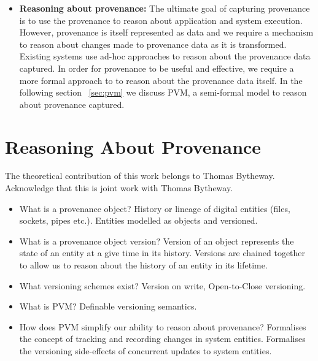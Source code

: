 \documentclass[withindex,glossary]{cam-thesis}
\begin{document}
\begin{itemize}
\item \textbf{Reasoning about provenance:}
The ultimate goal of capturing provenance is to use the provenance to reason about application and system execution. However, provenance is itself represented as data and we require a mechanism to reason about changes made to provenance data as it is transformed. Existing systems use ad-hoc approaches to reason about the provenance data captured. In order for provenance to be useful and effective, we require a more formal approach to to reason about the provenance data itself. In the following section ~\ref{sec:pvm} we discuss PVM, a semi-formal model to reason about provenance captured.

\end{itemize}

\section{Reasoning About Provenance}
The theoretical contribution of this work belongs to Thomas Bytheway.
Acknowledge that this is joint work with Thomas Bytheway.
\begin{itemize}
\item What is a provenance object? History or lineage of digital entities (files, sockets, pipes etc.). Entities modelled as objects and versioned.
\item What is a provenance object version? Version of an object represents the state of an entity at a give time in its history. Versions are chained together to allow us to reason about the history of an entity in its lifetime.
\item What versioning schemes exist? Version on write, Open-to-Close versioning.
\item What is PVM? Definable versioning semantics.
\item How does PVM simplify our ability to reason about provenance?
Formalises the concept of tracking and recording changes in system entities.
Formalises the versioning side-effects of concurrent updates to system entities.
\end{itemize}
\end{document}
